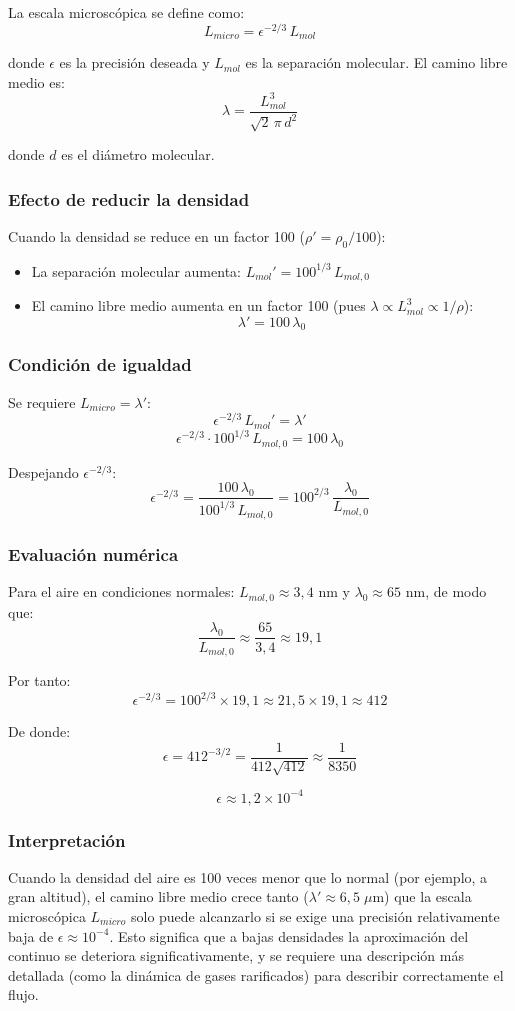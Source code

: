 \documentclass[a4paper]{article}
\begin{document}
La escala microscópica se define como:
$$
L_{micro} = \epsilon^{-2/3}\, L_{mol}
$$

donde $\epsilon$ es la precisión deseada y $L_{mol}$ es la separación molecular. El camino libre medio es:
$$
\lambda = \frac{L_{mol}^3}{\sqrt{2}\,\pi\, d^2}
$$

donde $d$ es el diámetro molecular.

\subsubsection{Efecto de reducir la densidad}

Cuando la densidad se reduce en un factor 100 ($\rho' = \rho_0/100$):

\begin{itemize}
    \item La separación molecular aumenta: $L_{mol}' = 100^{1/3}\, L_{mol,0}$
    \item El camino libre medio aumenta en un factor 100 (pues $\lambda \propto L_{mol}^3 \propto 1/\rho$):
$$
\lambda' = 100\,\lambda_0
$$
\end{itemize}

\subsubsection{Condición de igualdad}

Se requiere $L_{micro} = \lambda'$:
$$
\epsilon^{-2/3}\, L_{mol}' = \lambda'
$$
$$
\epsilon^{-2/3}\cdot 100^{1/3}\, L_{mol,0} = 100\,\lambda_0
$$

Despejando $\epsilon^{-2/3}$:
$$
\epsilon^{-2/3} = \frac{100\,\lambda_0}{100^{1/3}\, L_{mol,0}} = 100^{2/3}\,\frac{\lambda_0}{L_{mol,0}}
$$

\subsubsection{Evaluación numérica}

Para el aire en condiciones normales: $L_{mol,0} \approx 3{,}4$ nm y $\lambda_0 \approx 65$ nm, de modo que:
$$
\frac{\lambda_0}{L_{mol,0}} \approx \frac{65}{3{,}4} \approx 19{,}1
$$

Por tanto:
$$
\epsilon^{-2/3} = 100^{2/3}\times 19{,}1 \approx 21{,}5 \times 19{,}1 \approx 412
$$

De donde:
$$
\epsilon = 412^{-3/2} = \frac{1}{412\sqrt{412}} \approx \frac{1}{8350}
$$

$$
\boxed{\epsilon \approx 1{,}2 \times 10^{-4}}
$$

\subsubsection{Interpretación}

Cuando la densidad del aire es 100 veces menor que lo normal (por ejemplo, a gran altitud), el camino libre medio crece tanto ($\lambda' \approx 6{,}5\;\mu$m) que la escala microscópica $L_{micro}$ solo puede alcanzarlo si se exige una precisión relativamente baja de $\epsilon \approx 10^{-4}$. Esto significa que a bajas densidades la aproximación del continuo se deteriora significativamente, y se requiere una descripción más detallada (como la dinámica de gases rarificados) para describir correctamente el flujo.
\end{document}
